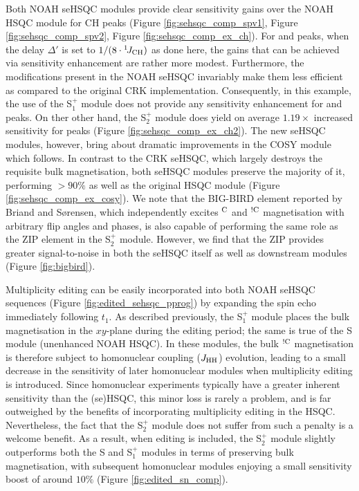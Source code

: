 \documentclass[11pt]{article}
\newcommand*{\noahS}{S}
\newcommand*{\noahSpa}{S$^+_1$}
\newcommand*{\noahSpb}{S$^+_2$}
\newcommand*{\hl}[1]{\textcolor{WildStrawberry}{#1}}
\newcommand*{\onejch}{{}^{1}\!J_{\ce{CH}}}
\newcommand*{\magn}[1]{\ce{^1H}$^{#1}$}
\newcommand*{\magnnot}[1]{\ce{^1H}$^{!#1}$}
\newcommand*{\jhh}{J_{\ce{HH}}}
\newcommand*{\figref}[1]{Figure \ref{fig:#1}}
\begin{document}
\hl{
Both NOAH seHSQC modules provide clear sensitivity gains over the NOAH HSQC module for CH peaks (\figref{sehsqc_comp_spv1}, \figref{sehsqc_comp_spv2}, \figref{sehsqc_comp_ex_ch}).
For \ce{CH2} and \ce{CH3} peaks, when the delay $\Delta'$ is set to $1/(8 \cdot \onejch)$ as done here, the gains that can be achieved via sensitivity enhancement are rather more modest.\autocite{Schleucher1994JBNMR}
Furthermore, the modifications present in the NOAH seHSQC invariably make them less efficient as compared to the original CRK implementation.
Consequently, in this example, the use of the \noahSpa{} module does not provide any sensitivity enhancement for \ce{CH2} and \ce{CH3} peaks.
On ther other hand, the \noahSpb{} module does yield on average $1.19\times$ increased sensitivity for \ce{CH2} peaks (\figref{sehsqc_comp_ex_ch2}).
The new seHSQC modules, however, bring about dramatic improvements in the COSY module which follows.
In contrast to the CRK seHSQC, which largely destroys the requisite bulk magnetisation, both seHSQC modules preserve the majority of it, performing $>90\%$ as well as the original HSQC module (\figref{sehsqc_comp_ex_cosy}).
We note that the BIG-BIRD element reported by Briand and S{\o}rensen\autocite{Briand1997JMR}, which independently excites \magn{\ce{C}} and \magnnot{\ce{C}} magnetisation with arbitrary flip angles and phases, is also capable of performing the same role as the ZIP element in the \noahSpb{} module.
However, we find that the ZIP provides greater signal-to-noise in both the seHSQC itself as well as downstream modules (\figref{bigbird}).
}

Multiplicity editing can be easily incorporated into both NOAH seHSQC sequences (\figref{edited_sehsqc_pprog}) by expanding the spin echo immediately following $t_1$.
\hl{
As described previously, the \noahSpa{} module places the bulk magnetisation in the $xy$-plane during the editing period; the same is true of the S module (unenhanced NOAH HSQC).
}
In these modules, the bulk \magnnot{\ce{C}} magnetisation is therefore subject to homonuclear coupling ($\jhh$) evolution, leading to a small decrease in the sensitivity of later homonuclear modules when multiplicity editing is introduced.
Since homonuclear experiments typically have a greater inherent sensitivity than the (se)HSQC, this minor loss is rarely a problem, and is far outweighed by the benefits of incorporating multiplicity editing in the HSQC.
Nevertheless, the fact that the \noahSpb{} module does not suffer from such a penalty is a welcome benefit.
\hl{
As a result, when editing is included, the \noahSpb{} module slightly outperforms both the \noahS{} and \noahSpa{} modules in terms of preserving bulk magnetisation, with subsequent homonuclear modules enjoying a small sensitivity boost of around $10\%$ (\figref{edited_sn_comp}).
}
\end{document}
